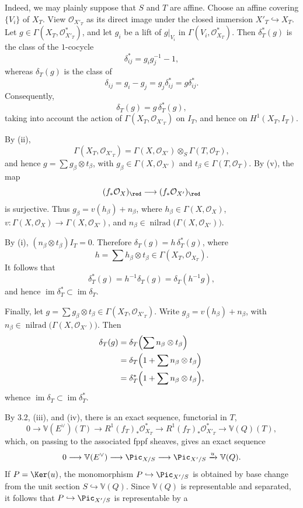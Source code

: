 Indeed, we may plainly suppose that $S$ and $T$ are affine. Choose an affine
covering $\{V_i\}$ of $X_T$. View $\mathcal O_{X'_T}$ as its direct image
under the closed immersion $X'_T\hookrightarrow X_T$. Let
$g\in\Gamma(X_T,\mathcal O_{X'_T}^{*})$, and let $g_i$ be a lift of
$g|_{V_i}$ in $\Gamma(V_i,\mathcal O_{X_T}^{*})$. Then $\delta_T^*(g)$ is
the class of the $1$-cocycle
\[
  \delta_{ij}^*=g_i g_j^{-1}-1,
\]
whereas $\delta_T(g)$ is the class of
\[
  \delta_{ij}=g_i-g_j=g_j\delta_{ij}^*=g\delta_{ij}^*.
\]
Consequently,
\[
  \delta_T(g)=g\,\delta_T^*(g),
\]
taking into account the action of
$\Gamma(X_T,\mathcal O_{X'_T})$ on $I_T$, and hence on $H^1(X_T,I_T)$.

By (ii),
\[
  \Gamma(X_T,\mathcal O_{X'_T})
  =\Gamma(X,\mathcal O_{X'})\otimes_S\Gamma(T,\mathcal O_T),
\]
and hence $g=\sum g_\beta\otimes t_\beta$, with
$g_\beta\in\Gamma(X,\mathcal O_{X'})$ and
$t_\beta\in\Gamma(T,\mathcal O_T)$. By (v), the map
\[
  (f_*\mathcal O_X)_{\red}\longrightarrow
  (f_*\mathcal O_{X'})_{\red}
\]
is surjective. Thus
$g_\beta=v(h_\beta)+n_\beta$, where
$h_\beta\in\Gamma(X,\mathcal O_X)$,
$v:\Gamma(X,\mathcal O_X)\to\Gamma(X,\mathcal O_{X'})$, and
$n_\beta\in\operatorname{nilrad}\bigl(\Gamma(X,\mathcal O_{X'})\bigr)$.

By (i), $(n_\beta\otimes t_\beta)I_T=0$. Therefore
$\delta_T(g)=h\,\delta_T^*(g)$, where
\[
  h=\sum h_\beta\otimes t_\beta
  \in\Gamma(X_T,\mathcal O_{X_T}).
\]
It follows that
\[
  \delta_T^*(g)=h^{-1}\delta_T(g)=\delta_T(h^{-1}g),
\]
and hence $\operatorname{im}\delta_T^*\subset
\operatorname{im}\delta_T$.

Finally, let
$g=\sum g_\beta\otimes t_\beta\in\Gamma(X_T,\mathcal O_{X'_T})$.
Write $g_\beta=v(h_\beta)+n_\beta$, with
$n_\beta\in\operatorname{nilrad}\bigl(\Gamma(X,\mathcal O_{X'})\bigr)$. Then
\[
\begin{split}
  \delta_T(g)
  &=\delta_T\Bigl(\sum n_\beta\otimes t_\beta\Bigr)\\
  &=\delta_T\Bigl(1+\sum n_\beta\otimes t_\beta\Bigr)\\
  &=\delta_T^*\Bigl(1+\sum n_\beta\otimes t_\beta\Bigr),
\end{split}
\]
whence $\operatorname{im}\delta_T\subset
\operatorname{im}\delta_T^*$.

By 3.2, (iii), and (iv), there is an exact sequence, functorial in $T$,
\[
  0\longrightarrow\mathbb V(E^\vee)(T)
  \longrightarrow R^1(f_T)_*\mathcal O_{X_T}^{*}
  \longrightarrow R^1(f_T)_*\mathcal O_{X'_T}^{*}
  \longrightarrow\mathbb V(Q)(T),
\]
which, on passing to the associated fppf sheaves, gives an exact sequence
\[
  0\longrightarrow\mathbb V(E^\vee)\longrightarrow\Pic_{X/S}
  \longrightarrow\Pic_{X'/S}\xrightarrow{u}\mathbb V(Q).
\]
If $P=\Ker(u)$, the monomorphism $P\hookrightarrow\Pic_{X'/S}$ is obtained
by base change from the unit section $S\hookrightarrow\mathbb V(Q)$.
Since $\mathbb V(Q)$ is representable and separated, it follows that
$P\hookrightarrow\Pic_{X'/S}$ is representable by a

